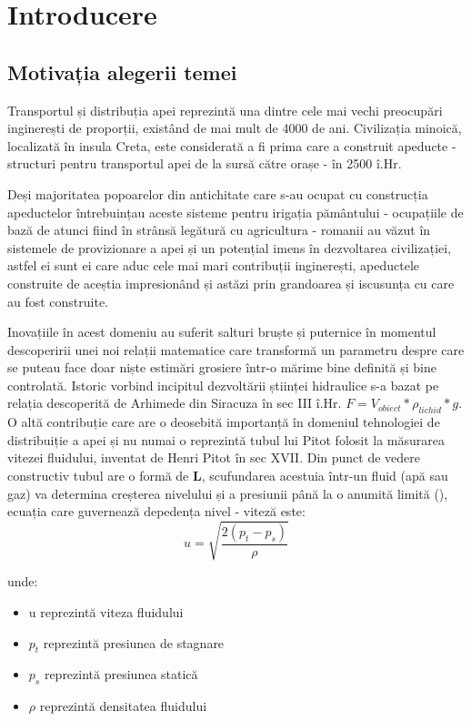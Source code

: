 \chapter{Introducere}
\label{chap:intro}

\section{Motivația alegerii temei}
Transportul și distribuția apei reprezintă una dintre cele mai vechi preocupări inginerești de proporții, existând de mai mult de 4000 de ani. Civilizația minoică, localizată în insula Creta, este considerată a fi prima care a construit apeducte - structuri pentru transportul apei de la sursă către orașe - în 2500 î.Hr. 

Deși majoritatea popoarelor din antichitate care s-au ocupat cu construcția apeductelor întrebuințau aceste sisteme pentru irigația pământului - ocupațiile de bază de atunci fiind în strânsă legătură cu agricultura - romanii au văzut în sistemele de provizionare a apei și un potențial imens în dezvoltarea civilizației, astfel ei sunt ei care aduc cele mai mari contribuții inginerești, apeductele construite de aceștia impresionând și astăzi prin grandoarea și iscusunța cu care au fost construite.

Inovațiile în acest domeniu au suferit salturi bruște și puternice în momentul descoperirii unei noi relații matematice care transformă un parametru despre care se puteau face doar niște estimări grosiere într-o mărime bine definită și bine controlată. Istoric vorbind incipitul dezvoltării științei hidraulice s-a bazat pe relația descoperită de Arhimede din Siracuza în sec III î.Hr. $F = V_{obiect}*\rho_{lichid}*g$. O altă contribuție care are o deosebită importanță în domeniul tehnologiei de distribuiție a apei și nu numai o reprezintă tubul lui Pitot folosit la măsurarea vitezei fluidului, inventat de Henri Pitot în sec XVII. Din punct de vedere constructiv tubul are o formă de \textbf{L}, scufundarea acestuia într-un fluid (apă sau gaz) va determina creșterea nivelului și a presiunii până la o anumită limită (\cite{klopfenstein1998air}), ecuația care guvernează depedența nivel - viteză este:
\begin{equation}
u = \sqrt{\frac{2(p_t-p_s)}{\rho}} 
\end{equation}

unde:

\begin{itemize}
\item u reprezintă viteza fluidului
\item $p_t$ reprezintă presiunea de stagnare
\item $p_s$ reprezintă presiunea statică
\item $\rho$ reprezintă densitatea fluidului
\end{itemize}

